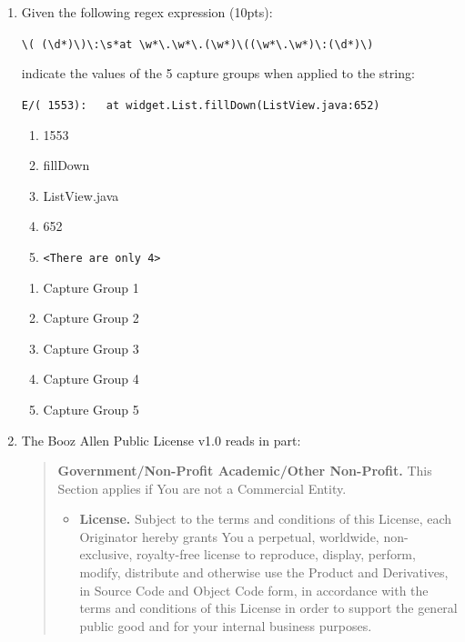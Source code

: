 \documentclass[10pt]{article}
\begin{document}
\begin{enumerate}
	\item Given the following regex expression (10pts):
	
	 \verb+\( (\d*)\)\:\s*at \w*\.\w*\.(\w*)\((\w*\.\w*)\:(\d*)\)+
	 
	 indicate the values of the 5 capture groups when applied to the string:
	 
	  \verb+E/( 1553):   at widget.List.fillDown(ListView.java:652)+
	\beginanswers
		\begin{enumerate}[1]
		\bigskip
		\item 1553
		\bigskip
		\item fillDown
		\bigskip
		\item ListView.java
		\bigskip
		\item 652
		\bigskip
		\item \verb|<There are only 4>|
		\bigskip
		\end{enumerate}
	\else
		
		\begin{enumerate}[1]
		\bigskip
		\item Capture Group 1	
		\bigskip
		\bigskip
	\bigskip
	\bigskip
		\bigskip
	\bigskip
	\bigskip
		\bigskip
		\bigskip
		\item Capture Group 2
		\bigskip
		\bigskip
	\bigskip
	\bigskip
		\bigskip
	\bigskip
	\bigskip
		\bigskip
		\bigskip
		\item Capture Group 3
		\bigskip
		\bigskip
	\bigskip
\bigskip
\bigskip
	\bigskip
\bigskip
\bigskip
		\bigskip
		\item Capture Group 4
		\bigskip
		\bigskip
		\bigskip
	\bigskip
	\bigskip
		\bigskip
	\bigskip
	\bigskip
		\bigskip
		\item Capture Group 5
		\bigskip
		\bigskip
		\bigskip
	\bigskip
	\bigskip
		\bigskip
	\bigskip
	\bigskip
		\bigskip
		\end{enumerate}
		\fi
	
\newpage


	\item The Booz Allen Public License v1.0 reads in part:
	
	\begin{quote}
		\textbf{Government/Non-Profit Academic/Other Non-Profit.}
		This Section applies if You are not a Commercial Entity.
		
		\begin{itemize}
			\item \textbf{License.} Subject to the terms and conditions of this License, each Originator hereby grants You a perpetual, worldwide, non-exclusive, royalty-free license to reproduce, display, perform, modify, distribute and otherwise use the Product and Derivatives, in Source Code and Object Code form, in accordance with the terms and conditions of this License in order to support the general public good and for your internal business purposes.
		

\end{itemize}
\end{quote}
\end{enumerate}
\end{document}
